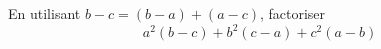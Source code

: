 En utilisant $b-c = (b-a) + (a-c)$, factoriser
\begin{displaymath}
 a^2(b-c) + b^2(c-a) + c^2(a-b)
\end{displaymath}
\bigskip \bigskip